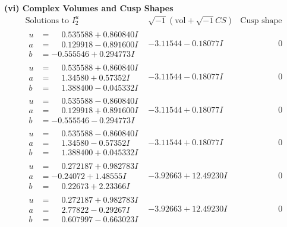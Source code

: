 \documentclass[1p]{elsarticle_modified}
\theoremstyle{definition}
\newcommand{\I}{\sqrt{-1}}
\begin{document}
\newpage\flushleft \textbf{(vi) Complex Volumes and Cusp Shapes}
$$\begin{array}{c|c|c}  
\text{Solutions to }I^u_{2}& \I (\text{vol} + \sqrt{-1}CS) & \text{Cusp shape}\\
 \hline 
\begin{aligned}
u &= \phantom{-}0.535588 + 0.860840 I \\
a &= \phantom{-}0.129918 - 0.891600 I \\
b &= -0.555546 + 0.294773 I\end{aligned}
 & -3.11544 - 0.18077 I & \phantom{-0.000000 } 0 \\ \hline\begin{aligned}
u &= \phantom{-}0.535588 + 0.860840 I \\
a &= \phantom{-}1.34580 + 0.57352 I \\
b &= \phantom{-}1.388400 - 0.045332 I\end{aligned}
 & -3.11544 - 0.18077 I & \phantom{-0.000000 } 0 \\ \hline\begin{aligned}
u &= \phantom{-}0.535588 - 0.860840 I \\
a &= \phantom{-}0.129918 + 0.891600 I \\
b &= -0.555546 - 0.294773 I\end{aligned}
 & -3.11544 + 0.18077 I & \phantom{-0.000000 } 0 \\ \hline\begin{aligned}
u &= \phantom{-}0.535588 - 0.860840 I \\
a &= \phantom{-}1.34580 - 0.57352 I \\
b &= \phantom{-}1.388400 + 0.045332 I\end{aligned}
 & -3.11544 + 0.18077 I & \phantom{-0.000000 } 0 \\ \hline\begin{aligned}
u &= \phantom{-}0.272187 + 0.982783 I \\
a &= -0.24072 + 1.48555 I \\
b &= \phantom{-}0.22673 + 2.23366 I\end{aligned}
 & -3.92663 + 12.49230 I & \phantom{-0.000000 } 0 \\ \hline\begin{aligned}
u &= \phantom{-}0.272187 + 0.982783 I \\
a &= \phantom{-}2.77822 - 0.29267 I \\
b &= \phantom{-}0.607997 - 0.663023 I\end{aligned}
 & -3.92663 + 12.49230 I & \phantom{-0.000000 } 0 \\ \hline\begin{aligned}

\end{aligned}
\end{array}$$
\end{document}
